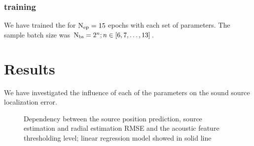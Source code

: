 \documentclass[applsci,article,submit,moreauthors,pdftex]{Definitions/mdpi}
\begin{document}
\subsubsection{\grnn{} training}
We have trained the \grnn{} for $ \mathrm{N}_{\mathrm{ep}} = 15 $ epochs with each set of parameters. The sample batch size was $ \mathrm{N}_{\mathrm{bs}} = 2^n; n \in [6,7,\dots,13] $. 


\section{Results}

We have investigated the influence of each of the parameters on the sound source localization error.

\begin{figure}[h!]
	\centering
	\caption{Dependency between the source position prediction, source \doa{} estimation  and radial estimation RMSE and the 
		acoustic feature thresholding level; 
		linear regression model showed in solid line}
	\label{fig:rmsethrmeanlvl}
\end{figure}
\end{document}
